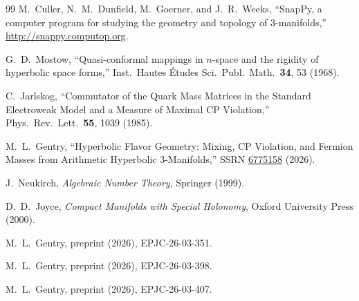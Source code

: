\documentclass[11pt,a4paper]{article}
\begin{document}
\begin{thebibliography}{99}
M.~Culler, N.~M.~Dunfield, M.~Goerner, and J.~R.~Weeks,
``SnapPy, a computer program for studying the geometry and topology 
of 3-manifolds,''
\url{http://snappy.computop.org}.

G.~D.~Mostow,
``Quasi-conformal mappings in $n$-space and the rigidity of hyperbolic 
space forms,''
Inst.\ Hautes \'Etudes Sci.\ Publ.\ Math.\ \textbf{34}, 53 (1968).

C.~Jarlskog,
``Commutator of the Quark Mass Matrices in the Standard Electroweak 
Model and a Measure of Maximal CP Violation,''
Phys.\ Rev.\ Lett.\ \textbf{55}, 1039 (1985).

M.~L.~Gentry,
``Hyperbolic Flavor Geometry: Mixing, CP Violation, and Fermion Masses
from Arithmetic Hyperbolic 3-Manifolds,''
SSRN \href{https://doi.org/10.2139/ssrn.6775158}{6775158} (2026).

J.~Neukirch,
\emph{Algebraic Number Theory},
Springer (1999).

D.~D.~Joyce,
\emph{Compact Manifolds with Special Holonomy},
Oxford University Press (2000).


M.~L.~Gentry,
preprint (2026), EPJC-26-03-351.

M.~L.~Gentry,
preprint (2026), EPJC-26-03-398.

M.~L.~Gentry,
preprint (2026), EPJC-26-03-407.
\end{thebibliography}
\end{document}
